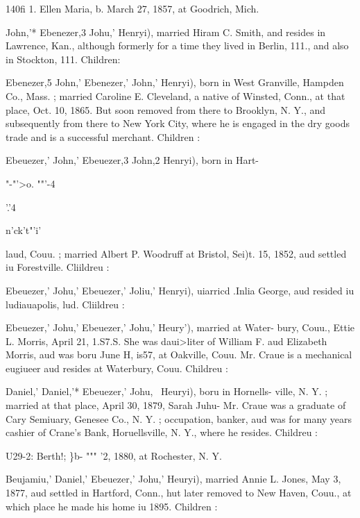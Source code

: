 \documentclass[oneside]{book}
\begin{document}
140fi 1. Ellen Maria, b. March 27, 1857, at Goodrich, Mich. 



John,'* Ebenezer,3 Johu,' Henryi), married Hiram C. Smith, and 
resides in Lawrence, Kan., although formerly for a time they lived 
in Berlin, 111., and also in Stockton, 111. Children: 



Ebenezer,5 John,' Ebenezer,' John,' Henryi), born in West 
Granville, Hampden Co., Mass. ; married Caroline E. Cleveland, 
a native of Winsted, Conn., at that place, Oct. 10, 1865. But 
soon removed from there to Brooklyn, N. Y., and subsequently 
from there to New York City, where he is engaged in the dry 
goods trade and is a successful merchant. Children : 



Ebeuezer,' John,' Ebeuezer,3 John,2 Henryi), born in Hart- 







"-"'>o. ""'-4 



'.'4 



n'ck't"'i' 




laud, Couu. ; married Albert P. Woodruff at Bristol, Sei)t. 15, 
1852, aud settled iu Forestville. Cliildreu : 



Ebeuezer,' Johu,' Ebeuezer,' Joliu,' Henryi), uiarricd .Inlia 
George, aud resided iu ludiauapolis, lud. Cliildreu : 


Ebeuezer,' Johu,' Ebeuezer,' Johu,' Heury'), married at Water- 
bury, Couu., Ettie L. Morris, April 21, 1.S7.S. She was daui>liter 
of William F. aud Elizabeth Morris, aud was boru June H, is57, 
at Oakville, Couu. Mr. Craue is a mechanical eugiueer aud 
resides at Waterbury, Couu. Childreu : 


Daniel,' Daniel,'* Ebeuezer,' Johu,~ Heuryi), boru in Hornells- 
ville, N. Y. ; married at that place, April 30, 1879, Sarah Juhu- 
Mr. Craue was a graduate of Cary Semiuary, Genesee Co., N. 
Y. ; occupation, banker, aud was for many years cashier of 
Crane's Bank, Horuellsville, N. Y., where he resides. Childreu : 

U29-2: Berth!; \}b- """ '2, 1880, at Rochester, N. Y. 

Beujamiu,' Daniel,' Ebeuezer,' Johu,' Heuryi), married Annie 
L. Jones, May 3, 1877, aud settled in Hartford, Conn., hut later 
removed to New Haven, Couu., at which place he made his home 
iu 1895. Children : 
\end{document}
